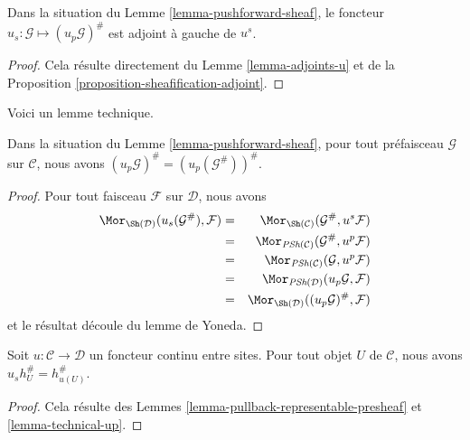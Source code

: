 \begin{lemma}
\label{lemma-adjoint-sheaves}
Dans la situation du Lemme \ref{lemma-pushforward-sheaf},
le foncteur $u_s : \mathcal{G} \mapsto (u_p \mathcal{G})^\#$
est adjoint à gauche de $u^s$.
\end{lemma}

\begin{proof}
Cela résulte directement du Lemme \ref{lemma-adjoints-u} et de la
Proposition \ref{proposition-sheafification-adjoint}.
\end{proof}

\noindent
Voici un lemme technique.

\begin{lemma}
\label{lemma-technical-up}
Dans la situation du Lemme \ref{lemma-pushforward-sheaf},
pour tout préfaisceau $\mathcal{G}$ sur $\mathcal{C}$,
nous avons $(u_p\mathcal{G})^\# = (u_p(\mathcal{G}^\#))^\#$.
\end{lemma}

\begin{proof}
Pour tout faisceau $\mathcal{F}$ sur $\mathcal{D}$, nous avons
\begin{eqnarray*}
\Mor_{\Sh(\mathcal{D})}(u_s(\mathcal{G}^\#), \mathcal{F})
& = &
\Mor_{\Sh(\mathcal{C})}(\mathcal{G}^\#, u^s\mathcal{F}) \\
& = &
\Mor_{\textit{PSh}(\mathcal{C})}(\mathcal{G}^\#, u^p\mathcal{F}) \\
& = &
\Mor_{\textit{PSh}(\mathcal{C})}(\mathcal{G}, u^p\mathcal{F}) \\
& = &
\Mor_{\textit{PSh}(\mathcal{D})}(u_p\mathcal{G}, \mathcal{F}) \\
& = &
\Mor_{\Sh(\mathcal{D})}((u_p\mathcal{G})^\#, \mathcal{F})
\end{eqnarray*}
et le résultat découle du lemme de Yoneda.
\end{proof}

\begin{lemma}
\label{lemma-pullback-representable-sheaf}
Soit $u : \mathcal{C} \to \mathcal{D}$ un foncteur continu
entre sites.
Pour tout objet $U$ de $\mathcal{C}$, nous avons $u_sh_U^\# = h_{u(U)}^\#$.
\end{lemma}

\begin{proof}
Cela résulte des
Lemmes \ref{lemma-pullback-representable-presheaf}
et \ref{lemma-technical-up}.
\end{proof}


